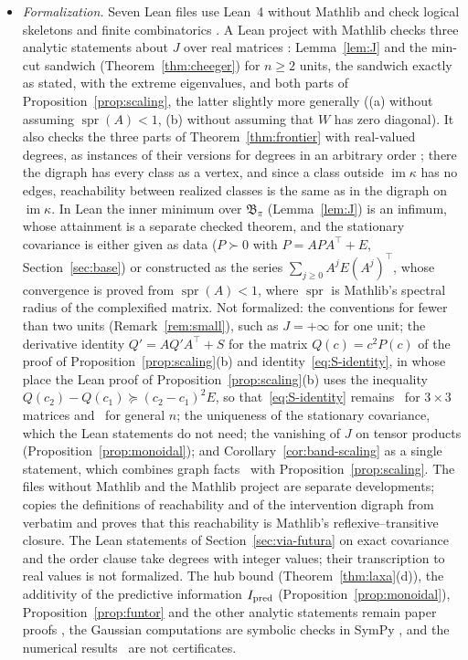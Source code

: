 \begin{itemize}
\item \emph{Formalization.} Seven Lean files use Lean~4 without Mathlib and check logical skeletons and finite combinatorics \stL. A Lean project with Mathlib checks three analytic statements about $J$ over real matrices \stM: Lemma~\ref{lem:J} and the min-cut sandwich (Theorem~\ref{thm:cheeger}) for $n\ge2$ units, the sandwich exactly as stated, with the extreme eigenvalues, and both parts of Proposition~\ref{prop:scaling}, the latter slightly more generally ((a) without assuming $\operatorname{spr}(A)<1$, (b) without assuming that $W$ has zero diagonal). It also checks the three parts of Theorem~\ref{thm:frontier} with real-valued degrees, as instances of their versions for degrees in an arbitrary order \stM; there the digraph has every class as a vertex, and since a class outside $\operatorname{im}\kappa$ has no edges, reachability between realized classes is the same as in the digraph on $\operatorname{im}\kappa$. In Lean the inner minimum over $\mathfrak B_\pi$ (Lemma~\ref{lem:J}) is an infimum, whose attainment is a separate checked theorem, and the stationary covariance is either given as data ($P\succ0$ with $P=APA^\top+E$, Section~\ref{sec:base}) or constructed as the series $\sum_{j\ge0}A^jE(A^j)^\top$, whose convergence is proved from $\operatorname{spr}(A)<1$, where $\operatorname{spr}$ is Mathlib's spectral radius of the complexified matrix. Not formalized: the conventions for fewer than two units (Remark~\ref{rem:small}), such as $J=+\infty$ for one unit; the derivative identity $Q'=AQ'A^\top+S$ for the matrix $Q(c)=c^2P(c)$ of the proof of Proposition~\ref{prop:scaling}(b) and identity~\eqref{eq:S-identity}, in whose place the Lean proof of Proposition~\ref{prop:scaling}(b) uses the inequality $Q(c_2)-Q(c_1)\succeq(c_2-c_1)^2E$, so that~\eqref{eq:S-identity} remains \stS\ for $3\times3$ matrices and \stA\ for general $n$; the uniqueness of the stationary covariance, which the Lean statements do not need; the vanishing of $J$ on tensor products (Proposition~\ref{prop:monoidal}); and Corollary~\ref{cor:band-scaling} as a single statement, which combines graph facts \stL\ with Proposition~\ref{prop:scaling}. The files without Mathlib and the Mathlib project are separate developments;  copies the definitions of reachability and of the intervention digraph from  verbatim and proves that this reachability is Mathlib's reflexive--transitive closure. The Lean statements of Section~\ref{sec:via-futura} on exact covariance and the order clause take degrees with integer values; their transcription to real values is not formalized. The hub bound (Theorem~\ref{thm:laxa}(d)), the additivity of the predictive information $I_{\rm pred}$ (Proposition~\ref{prop:monoidal}), Proposition~\ref{prop:funtor} and the other analytic statements remain paper proofs \stA, the Gaussian computations are symbolic checks in SymPy \stS, and the numerical results \stN\ are not certificates.

\end{itemize}
